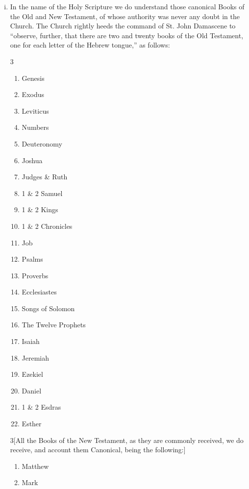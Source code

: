 \begin{enumerate}
\begin{enumerate}[i.]
		\item In the name of the Holy Scripture we do understand those canonical Books of the Old and New Testament, of whose authority was never any doubt in the Church. The Church rightly heeds the command of St. John Damascene to ``observe, further, that there are two and twenty books of the Old Testament, one for each letter of the Hebrew tongue,'' as follows:
	\begin{multicols}{3}
	\begin{enumerate}[1.]
		\item Genesis
		\item Exodus
		\item Leviticus
		\item Numbers
		\item Deuteronomy
		\item Joshua
		\item Judges \& Ruth
		\item 1 \& 2 Samuel
		\item 1 \& 2 Kings
		\item 1 \& 2 Chronicles
		\item Job
		\item Psalms
		\item Proverbs
		\item Ecclesiastes
		\item Songs of Solomon
		\item The Twelve Prophets
		\item Isaiah
		\item Jeremiah
		\item Ezekiel
		\item Daniel
		\item 1 \& 2 Esdras
		\item Esther
	\end{enumerate}
	\end{multicols}
	\begin{multicols}{3}[All the Books of the New Testament, as they are commonly received, we do receive, and account them Canonical, being the following:]
	\begin{enumerate}[1.]
		\item Matthew
		\item Mark

\end{enumerate}
\end{multicols}
\end{enumerate}
\end{enumerate}
